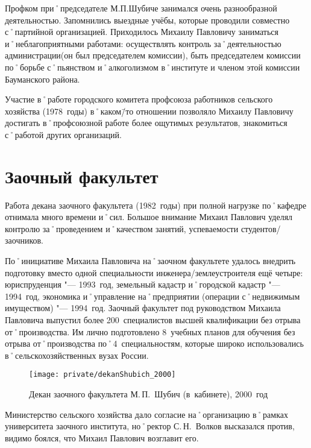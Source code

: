 Профком при˚председателе М.П.Шубиче занимался очень разнообразной деятельностью. Запомнились выездные учёбы, которые проводили совместно с˚партийной организацией. Приходилось Михаилу Павловичу заниматься и˚неблагоприятными работами: осуществлять контроль за˚деятельностью администрации(он был председателем комиссии), быть председателем комиссии по˚борьбе с˚пьянством и˚алкоголизмом в˚институте и членом этой комиссии Бауманского района.

Участие в˚работе городского комитета профсоюза работников сельского хозяйства (1978~годы) в˚каком\=/то отношении позволяло Михаилу Павловичу достигать в˚профсоюзной работе более ощутимых результатов, знакомиться с˚работой других организаций.






\section*{Заочный факультет}
\label{sec:correspondenceFaculty}

Работа декана заочного факультета (1982~годы) при полной нагрузке по˚кафедре отнимала много времени и˚сил. Большое внимание Михаил Павлович уделял контролю за˚проведением и˚качеством занятий, успеваемости студентов\-/заочников.

По˚инициативе Михаила Павловича на˚заочном факультете удалось внедрить подготовку вместо одной специальности инженера\-/землеустроителя ещё четыре: юриспруденция "--- 1993~год, земельный кадастр и˚городской кадастр "--- 1994~год, экономика и˚управление на˚предприятии (операции с˚недвижимым имуществом) "--- 1994~год. Заочный факультет под руководством Михаила Павловича выпустил более 200~специалистов высшей квалификации без отрыва от˚производства. Им лично подготовлено 8~учебных планов для обучения без отрыва от˚производства по˚4~специальностям, которые широко использовались в˚сельскохозяйственных вузах России. 

\begin{figure}[h]
\texttt{[image: private/dekanShubich\_2000]}
\caption[Декан заочного факультета М.\,П.~Шубич (в~кабинете), 2000~год]{Декан заочного факультета М.\,П.~Шубич (в~кабинете), 2000~год\footnotemark}
\label{fig:dekanShubich_2000}
\end{figure}

Министерство сельского хозяйства дало согласие на˚организацию в˚рамках университета заочного института, но˚ректор С.\,Н.~Волков высказался против, видимо боялся, что Михаил Павлович возглавит его.

